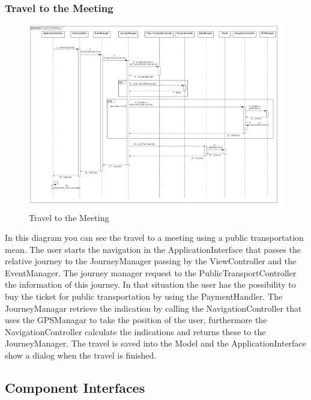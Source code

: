 \subsubsection{Travel to the Meeting}
\begin{figure}[!h]
\centering
\includegraphics[scale=0.25]{images/TravelToTheMeeting}
\caption{Travel to the Meeting}
\end{figure}
\par\bigskip 
\noindent
In this diagram you can see the travel to a meeting using a public transportation mean. The user starts the navigation in the ApplicationInterface that passes the relative journey to the JourneyManager passing by the ViewController and the EventManager. The journey manager request to the PublicTransportController the information of this journey. In that situation the user has the possibility to buy the ticket for public transportation by using the PaymentHandler. The JourneyManagar retrieve the indication by calling the NavigationController that uses the GPSManagar to take the position of the user, furthermore the NavigationController calculate the indications and returns these to the JourneyManager. The travel is saved into the Model and the ApplicationInterface show a dialog when the travel is finished.

\clearpage
\subsection{Component Interfaces}

\clearpage
